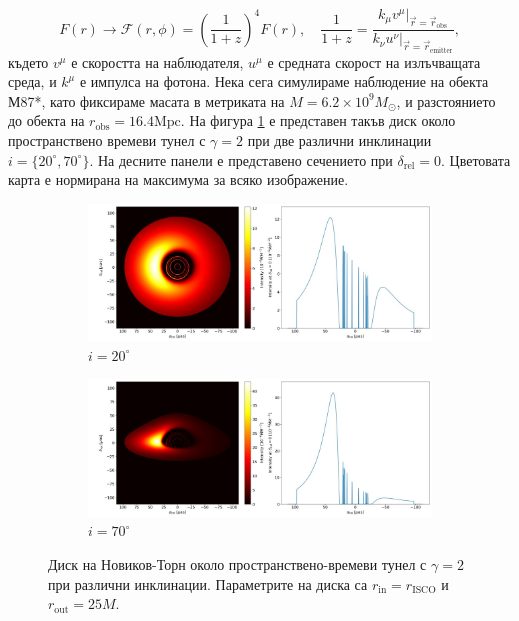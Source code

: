 \documentclass[12pt]{article}
\numberwithin{equation}{section}
\numberwithin{figure}{section}
\begin{document}
	\begin{equation}
		F(r)\rightarrow\mathcal{F}(r,\phi) = \left(\frac{1}{1+z} \right)^4 F(r),\quad \frac{1}{1 + z} = \frac{k_\mu v^\mu\vert_{\vec{r} = \vec{r}_\text{obs}}}{k_\nu u^\nu\vert_{\vec{r} = \vec{r}_\text{emitter}}},
	\end{equation}
	където $v^\mu$ е скоростта на наблюдателя, $u^\mu$ е средната скорост на излъчващата среда, и $k^\mu$ е импулса на фотона. Нека сега симулираме наблюдение на обекта М87*, като фиксираме масата в метриката на $M = 6.2\times10^9 M_\odot$, и разстоянието до обекта на $r_\text{obs} = 16.4 \text{Mpc}$. На фигура \ref{WH_NT} е представен такъв диск около пространствено времеви тунел с $\gamma = 2$ при две различни инклинации $i=\{20^\circ, 70^\circ\}$. На десните панели е представено сечението при $\delta_\text{rel} = 0$. Цветовата карта е нормирана на максимума за всяко изображение. \\
	
	\begin{figure}[!htb]
		\centering
		\begin{subfigure}{12cm}
			\hspace{-0.6cm}
			\includegraphics[scale = 0.4]{Section_6_Morphology_of_the images_of_horizonless_spacetimes/WH_NT_Gamma2_20_deg.jpg}
			\caption{$i = 20^\circ$} 
		\end{subfigure}
		\begin{subfigure}{12cm}
			\hspace{-0.6cm}
			\includegraphics[scale = 0.4]{Section_6_Morphology_of_the images_of_horizonless_spacetimes/WH_NT_Gamma2_70_deg.jpg}
			\caption{$i = 70^\circ$} 
		\end{subfigure}
		\caption[Диск на Новиков-Торн около пространствено-времеви тунел при различни инклинации.]{\small Диск на Новиков-Торн около пространствено-времеви тунел с $\gamma = 2$ при различни инклинации. Параметрите на диска са $r_\text{in} = r_\text{ISCO}$ и $r_\text{out} = 25M$.} 
		\label{WH_NT}
	\end{figure}
	
\end{document}
